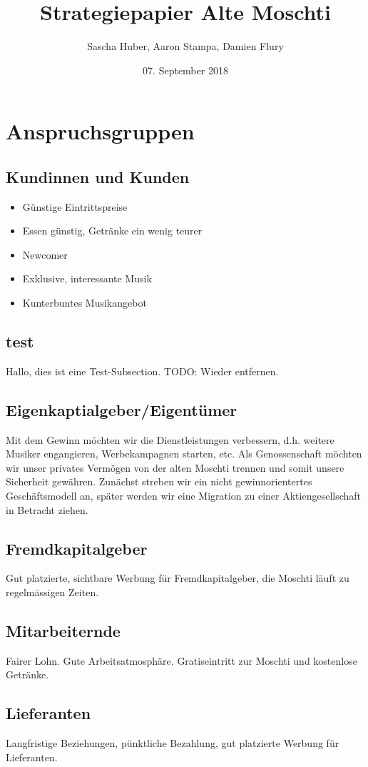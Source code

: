 \documentclass[a4paper, titlepage]{article}
\title{Strategiepapier Alte Moschti}
\author{Sascha Huber, Aaron Stampa, Damien Flury}
\date{07. September 2018}
\begin{document}
\maketitle

\tableofcontents
\newpage

\section{Anspruchsgruppen}
\subsection{Kundinnen und Kunden}
\begin{itemize}
  \item Günstige Eintrittspreise
  \item Essen günstig, Getränke ein wenig teurer
  \item Newcomer
  \item Exklusive, interessante Musik
  \item Kunterbuntes Musikangebot
\end{itemize}
\subsection{test}
Hallo, dies ist eine Test-Subsection. TODO: Wieder entfernen.
\subsection{Eigenkaptialgeber/Eigentümer}
Mit dem Gewinn möchten wir die Dienstleistungen verbessern, d.h. weitere Musiker engangieren,
Werbekampagnen starten, etc. Als Genossenschaft möchten wir unser privates Vermögen von der
alten Moschti trennen und somit unsere Sicherheit gewähren. Zunächst streben wir ein nicht gewinnorientertes
Geschäftsmodell an, später werden wir eine Migration zu einer Aktiengesellschaft in Betracht ziehen.
\subsection{Fremdkapitalgeber}
Gut platzierte, sichtbare Werbung für Fremdkapitalgeber, die Moschti läuft zu regelmässigen Zeiten.
\subsection{Mitarbeiternde}
Fairer Lohn. Gute Arbeitsatmosphäre. Gratiseintritt zur Moschti und kostenlose Getränke.
\subsection{Lieferanten}
Langfristige Beziehungen, pünktliche Bezahlung, gut platzierte Werbung für Lieferanten.
\end{document}
